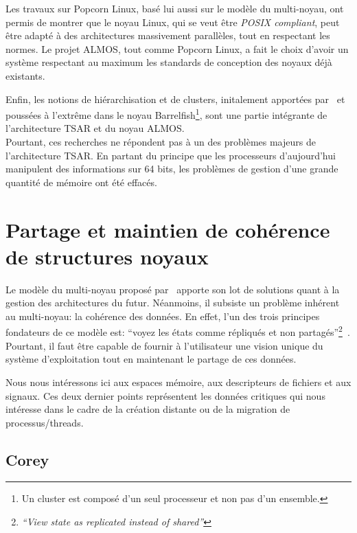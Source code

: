       Les travaux sur Popcorn Linux, basé lui aussi sur le modèle du
      multi-noyau, ont permis de montrer que le noyau Linux, qui se veut être
      \textit{POSIX compliant}, peut être adapté à des architectures massivement
      parallèles, tout en respectant les normes. Le projet ALMOS, tout comme
      Popcorn Linux, a fait le choix d'avoir un système respectant au maximum
      les standards de conception des noyaux déjà existants.

      Enfin, les notions de hiérarchisation et de clusters, initalement
      apportées par~\citet{unrau1995hierarchical} et poussées à l'extrême dans
      le noyau Barrelfish\footnote{Un cluster est composé d'un seul processeur
        et non pas d'un ensemble.}, sont une partie intégrante de l'architecture
      TSAR et du noyau ALMOS.\\

      Pourtant, ces recherches ne répondent pas à un des problèmes majeurs de
      l'architecture TSAR. En partant du principe que les processeurs
      d'aujourd'hui manipulent des informations sur 64 bits, les problèmes de
      gestion d'une grande quantité de mémoire ont été effacés.


  \section{Partage et maintien de cohérence de structures noyaux}
  \label{sec:consistency}

    Le modèle du multi-noyau proposé par~\citeauthor{baumann2009multikernel}
    apporte son lot de solutions quant à la gestion des architectures du
    futur. Néanmoins, il subsiste un problème inhérent au multi-noyau: la
    cohérence des données. En effet, l'un des trois principes fondateurs de ce
    modèle est: ``voyez les états comme répliqués et non
    partagés''\footnote{\textit{``View state as replicated instead of
        shared''}}~\citep{baumann2009multikernel}. Pourtant, il faut être
    capable de fournir à l'utilisateur une vision unique du système
    d'exploitation tout en maintenant le partage de ces données.

    Nous nous intéressons ici aux espaces mémoire, aux descripteurs de fichiers
    et aux signaux. Ces deux dernier points représentent les données critiques
    qui nous intéresse dans le cadre de la création distante ou de la migration
    de processus/threads.

    \subsection{Corey}
    \label{subsec:corey}

